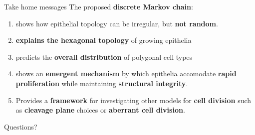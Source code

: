 \documentclass[aspectratio=169, 10pt]{beamer}
\begin{document}
\begin{frame}[fragile]{Take home messages} 
  The proposed \textbf{discrete Markov chain}:
  \begin{enumerate}
    \item shows how epithelial topology can be irregular, but \textbf{not random}.
    \item \textbf{explains the hexagonal topology} of growing epithelia
    \item predicts the \textbf{overall distribution} of polygonal cell types
    \item shows an \textbf{emergent mechanism} by which epithelia accomodate \textbf{rapid proliferation} while maintaining \textbf{structural integrity}. 
    \item Provides a \textbf{framework} for investigating other models for \textbf{cell division} such as \textbf{cleavage plane} choices or \textbf{aberrant cell division}.
  \end{enumerate}
\end{frame}

\begin{frame}[standout]
  Questions?
\end{frame}

\appendix
\end{document}
